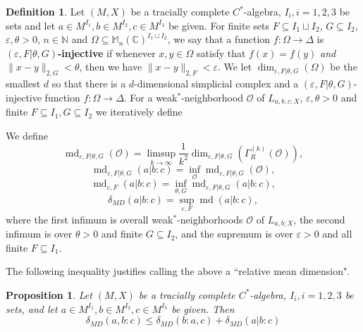 \documentclass[10pt]{amsart}
\newtheorem{prop}[thm]{Proposition}
\theoremstyle{definition}
\newtheorem{defn}[thm]{Definition}
\numberwithin{equation}{section}
\newcommand{\bC}{{\mathbb C}}
\newcommand{\bM}{{\mathbb M}}
\newcommand{\bN}{{\mathbb N}}
\DeclareMathOperator{\md}{md}
\begin{document}
\begin{defn}
Let $(M,X)$ be a tracially complete $C^{*}$-algebra, $I_{i},i=1,2,3$ be sets and let $a\in M^{I_{1}},b\in M^{I_{2}},c\in M^{I_{3}}$ be given. For finite sets $F\subseteq I_{1}\sqcup I_{2}$, $G\subseteq I_{2}$, $\varepsilon,\theta>0$, $n\in \bN$ and $\Omega\subseteq \bM_{n}(\bC)^{I_{1}\sqcup I_{2}}$, we say that a function $f\colon \Omega\to \Delta$ is \textbf{$(\varepsilon,F|\theta,G)$-injective} if whenever $x,y\in \Omega$  satisfy that $f(x)=f(y)$ \emph{and} $\|x-y\|_{2,G}<\theta$, then we have $\|x-y\|_{2,F}<\varepsilon$. We let $\dim_{\varepsilon,F|\theta,G}(\Omega)$ be the smallest $d$ so that there is a $d$-dimensional simplicial complex and a $(\varepsilon,F|\theta,G)$-injective function $f\colon \Omega\to \Delta$. For a weak$^{*}$-neighborhood $\mathcal{O}$ of $L_{a,b,c:X}$, $\varepsilon,\theta>0$ and finite $F\subseteq I_{1},G\subseteq I_{2}$ we iteratively define

We define
\[\md_{\varepsilon,F|\theta,G}(\mathcal{O})=\limsup_{k\to\infty}\frac{1}{k^{2}}\dim_{\varepsilon,F|\theta,G}(\Gamma^{(k)}_{R}(\mathcal{O})),\]
\[\md_{\varepsilon,F|\theta,G}(a|b:c)=\inf_{\mathcal{O}}\md_{\varepsilon,F|\theta,G}(\mathcal{O}),\]
\[\md_{\varepsilon,F}(a|b:c)=\inf_{\theta,G}\md_{\varepsilon,F|\theta,G}(a|b:c),\]
\[\delta_{MD}(a|b:c)=\sup_{\varepsilon,F}\md(a|b:c),\]
where the first infimum is overall weak$^{*}$-neighborhoods $\mathcal{O}$ of $L_{a,b;X}$, the second infimum is over $\theta>0$ and finite $G\subseteq I_{2}$, and the supremum is over $\varepsilon>0$ and all finite $F\subseteq I_{1}$.


\end{defn}

The following inequality justifies calling the above a ``relative mean dimension".


\begin{prop}\label{prop: relative inequlaity}
Let $(M,X)$ be a tracially complete $C^{*}$-algebra, $I_{i},i=1,2,3$ be sets, and let $a\in M^{I_{1}},b\in M^{I_{2}},c\in M^{I_{3}}$ be given. Then
\[\delta_{MD}(a,b:c)\leq \delta_{MD}(b:a,c)+\delta_{MD}(a|b:c)\]
\end{prop}
\end{document}
